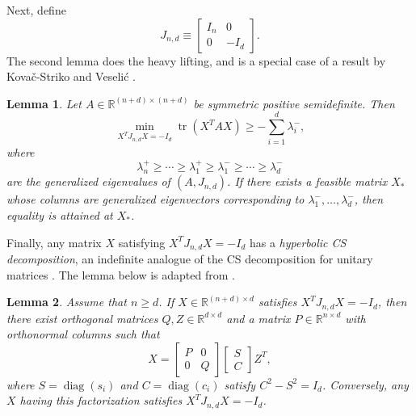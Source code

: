 \documentclass{article}
\newtheorem{lemma}{Lemma}
\newcommand{\tr}{\operatorname{tr}}
\newcommand{\ts}{^T}
\DeclareMathOperator{\Diag}{diag}
\begin{document}
Next, define
\begin{equation*}
    J_{n,d} \equiv \begin{bmatrix}
        I_n & 0\\ 0 & -I_d
    \end{bmatrix}.
\end{equation*}
The second lemma does the heavy lifting, and is a special case of a result by Kova\v{c}-Striko and Veseli\'{c} \cite[Thm.~3.1]{kovavc1995trace}.
\begin{lemma}\label{lemma:striko_trace}
    Let $A\in \mathbb{R}^{(n+d)\times (n+d)}$ be symmetric positive semidefinite. Then
    \begin{equation*}
        \min_{X\ts J_{n,d}X = -I_d} \tr (X\ts AX) \geq -\sum_{i=1}^d\lambda_i^{-},
    \end{equation*}
    where 
    \begin{equation*}
       \lambda_n^+\geq \cdots \geq \lambda_1^+ \geq  \lambda_1^- \geq \cdots \geq \lambda_d^-
    \end{equation*} are the generalized eigenvalues of $(A, J_{n,d})$. If there exists a feasible matrix $X_*$ whose columns are generalized eigenvectors corresponding to $\lambda_1^{-},\ldots,\lambda_{d}^-$, then equality is attained at $X_*$. 
\end{lemma}

Finally, any matrix $X$ satisfying $X\ts J_{n,d}X=-I_d$ has a {\em hyperbolic CS decomposition}, an indefinite analogue of the CS decomposition for unitary matrices \cite[Thm.~2.5.3]{GoVa13}. The lemma below is adapted from  \cite[Thm.~3.2]{higham2003jorthogonal}.
\begin{lemma}\label{lemma:hyperbolic_CS}
    Assume that $n\geq d$. If $X\in \mathbb{R}^{(n+d)\times d}$ satisfies $X\ts J_{n,d}X = -I_d$, then there exist orthogonal matrices $Q, Z\in \mathbb{R}^{d\times d}$ and a matrix $P\in \mathbb{R}^{n\times d}$ with orthonormal columns such that
    \begin{equation*}
     X = \begin{bmatrix}
         P & 0 \\ 0 & Q
     \end{bmatrix}\begin{bmatrix}
         S \\ C
     \end{bmatrix}Z\ts, 
    \end{equation*}
    where $S=\Diag(s_i)$ and $C=\Diag(c_i)$ satisfy ${C^2 - S^2=I_d}$. Conversely, any $X$ having this factorization satisfies $X\ts J_{n,d}X=-I_d$.
\end{lemma}
\end{document}
